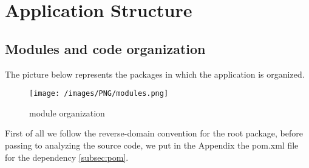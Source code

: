%
%
\chapter{Application Structure}

\section{Modules and code organization}
\justifying
The picture below represents the packages in which the application is organized.
\begin{figure}[H]
\begin{center}
\texttt{[image: /images/PNG/modules.png]}
\caption{module organization}
\end{center}
\end{figure}
First of all we follow the reverse-domain convention for the root package, before passing to analyzing the source code, we put in the Appendix the pom.xml file for the dependency \cref{subsec:pom}.

